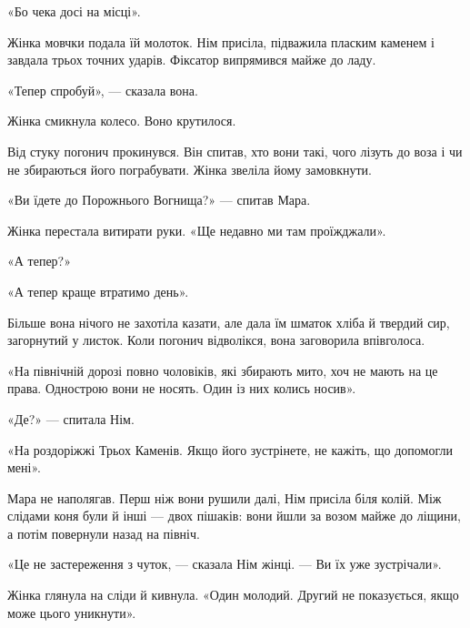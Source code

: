 \documentclass[10pt,a4paper]{article}
\begin{document}
«Бо чека досі на місці».

Жінка мовчки подала їй молоток. Нім присіла, підважила пласким каменем і завдала трьох точних ударів. Фіксатор випрямився майже до ладу.

«Тепер спробуй», --- сказала вона.

Жінка смикнула колесо. Воно крутилося.

Від стуку погонич прокинувся. Він спитав, хто вони такі, чого лізуть до воза і чи не збираються його пограбувати. Жінка звеліла йому замовкнути.

«Ви їдете до Порожнього Вогнища?» --- спитав Мара.

Жінка перестала витирати руки. «Ще недавно ми там проїжджали».

«А тепер?»

«А тепер краще втратимо день».

Більше вона нічого не захотіла казати, але дала їм шматок хліба й твердий сир, загорнутий у листок. Коли погонич відволікся, вона заговорила впівголоса.

«На північній дорозі повно чоловіків, які збирають мито, хоч не мають на це права. Однострою вони не носять. Один із них колись носив».

«Де?» --- спитала Нім.

«На роздоріжжі Трьох Каменів. Якщо його зустрінете, не кажіть, що допомогли мені».

Мара не наполягав. Перш ніж вони рушили далі, Нім присіла біля колій. Між слідами коня були й інші --- двох пішаків: вони йшли за возом майже до ліщини, а потім повернули назад на північ.

«Це не застереження з чуток, --- сказала Нім жінці. --- Ви їх уже зустрічали».

Жінка глянула на сліди й кивнула. «Один молодий. Другий не показується, якщо може цього уникнути».
\end{document}
